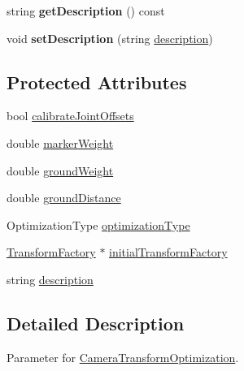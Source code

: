 \begin{DoxyCompactItemize}
\item 
\hypertarget{classCameraTransformOptimizationParameter_a2cc7b859e437a6c166d8ca8d5e69b579}{string {\bfseries get\-Description} () const }\label{classCameraTransformOptimizationParameter_a2cc7b859e437a6c166d8ca8d5e69b579}

\item 
\hypertarget{classCameraTransformOptimizationParameter_a9be86fc1c82c37b60f550c37204a90eb}{void {\bfseries set\-Description} (string \hyperlink{classCameraTransformOptimizationParameter_ab90c93f4e267aeac97ea826455ab52b3}{description})}\label{classCameraTransformOptimizationParameter_a9be86fc1c82c37b60f550c37204a90eb}

\end{DoxyCompactItemize}
\subsection*{\-Protected \-Attributes}
\begin{DoxyCompactItemize}
\item 
bool \hyperlink{classCameraTransformOptimizationParameter_a6ad5c2d68c9a05b28fd3e0ec0e1c68e0}{calibrate\-Joint\-Offsets}
\item 
double \hyperlink{classCameraTransformOptimizationParameter_abcb7e55046194fb133a3cd5e63f22b66}{marker\-Weight}
\item 
double \hyperlink{classCameraTransformOptimizationParameter_a6903913052edf580ad47b3e68da6b173}{ground\-Weight}
\item 
double \hyperlink{classCameraTransformOptimizationParameter_ad081b0ee8bb11679267bcbd193724b0c}{ground\-Distance}
\item 
\-Optimization\-Type \hyperlink{classCameraTransformOptimizationParameter_ac6f12c5a7260847f6a2e3414baf607f0}{optimization\-Type}
\item 
\hyperlink{classTransformFactory}{\-Transform\-Factory} $\ast$ \hyperlink{classCameraTransformOptimizationParameter_aaa19ab7384e804ea0bfc6051700ff9f1}{initial\-Transform\-Factory}
\item 
string \hyperlink{classCameraTransformOptimizationParameter_ab90c93f4e267aeac97ea826455ab52b3}{description}
\end{DoxyCompactItemize}


\subsection{\-Detailed \-Description}
\-Parameter for \hyperlink{classCameraTransformOptimization}{\-Camera\-Transform\-Optimization}. 

